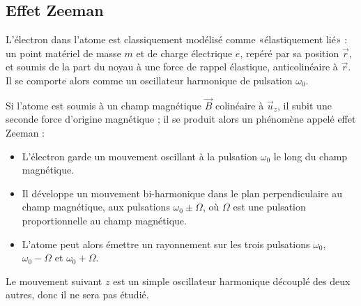 \subsection{Effet Zeeman}
L'électron dans l'atome est classiquement modélisé comme «élastiquement lié» : un point matériel de masse $m$ et de charge électrique $e$, repéré par sa position $\vec{r}$, et soumis de la part du noyau à une force de rappel élastique, anticolinéaire à $\vec{r}$. Il se comporte alors comme un oscillateur harmonique de pulsation $\omega_0$.

Si l'atome est soumis à un champ magnétique $\vec{B}$ colinéaire à $\vec{u}_z$, il subit une seconde force d'origine magnétique ; il se produit alors un phénomène appelé effet Zeeman :
	\begin{itemize}
	\item L'électron garde un mouvement oscillant à la pulsation $\omega_0$ le long du champ magnétique.
	\item Il développe un mouvement bi-harmonique dans le plan perpendiculaire au champ magnétique, aux pulsations $\omega_0\pm\Omega$, où $\Omega$ est une pulsation proportionnelle au champ magnétique.
	\item L'atome peut alors émettre un rayonnement sur les trois pulsations $\omega_0$, $\omega_0-\Omega$ et $\omega_0+\Omega$.
	\end{itemize}
Le mouvement suivant $z$ est un simple oscillateur harmonique découplé des deux autres, donc il ne sera pas étudié.

